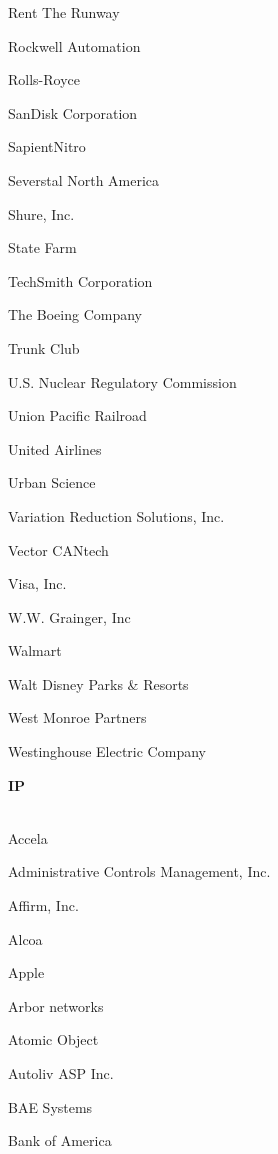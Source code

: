 \documentclass[twoside]{article}
\begin{document}
\begin{center}
\begin{multicols}{5}
\begin{FlushLeft}
\begin{compactitem}
\item Rent The Runway
\item Rockwell Automation
\item Rolls-Royce
\item SanDisk Corporation
\item SapientNitro
\item Severstal North America
\item Shure, Inc.
\item State Farm
\item TechSmith Corporation
\item The Boeing Company
\item Trunk Club
\item U.S. Nuclear Regulatory Commission
\item Union Pacific Railroad
\item United Airlines
\item Urban Science
\item Variation Reduction Solutions, Inc.
\item Vector CANtech
\item Visa, Inc.
\item W.W. Grainger, Inc
\item Walmart
\item Walt Disney Parks \& Resorts
\item West Monroe Partners
\item Westinghouse Electric Company
\end{compactitem}
        \end{FlushLeft}
        \vspace{1em}
        {\fontsize{14}{16}\selectfont \bf IP}\\
        \vspace{-1em}
        ~\hrulefill~
        \vspace{-.9em}
        \begin{FlushLeft}
        \begin{compactitem}
        \item Accela
\item Administrative Controls Management, Inc.
\item Affirm, Inc.
\item Alcoa
\item Apple
\item Arbor networks
\item Atomic Object
\item Autoliv ASP Inc.
\item BAE Systems
\item Bank of America

\end{compactitem}
\end{FlushLeft}
\end{multicols}
\end{center}
\end{document}
